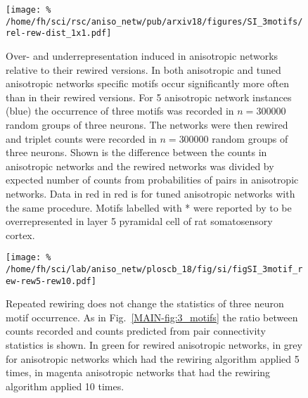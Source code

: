 
\addtocounter{subsection}{1}
\begin{figure}[h!]
  \texttt{[image: \%
    /home/fh/sci/rsc/aniso\_netw/pub/arxiv18/figures/SI\_3motifs/rel-rew-dist\_1x1.pdf]}
  \caption{Over- and underrepresentation induced in anisotropic
    networks relative to their rewired versions. In both anisotropic
    and tuned anisotropic networks specific motifs occur significantly
    more often than in their rewired versions. For 5 anisotropic
    network instances (blue) the occurrence of three motifs was
    recorded in $n=300000$ random groups of three neurons. The
    networks were then rewired and triplet counts were recorded in
    $n=300000$ random groups of three neurons. Shown is the difference
    between the counts in anisotropic networks and the rewired
    networks was divided by expected number of counts from
    probabilities of pairs in anisotropic networks. Data in red in red
    is for tuned anisotropic networks with the same procedure. Motifs
    labelled with * were reported by \textcite{Perin2011} to be
    overrepresented in layer 5 pyramidal cell of rat somatosensory
    cortex.}
  \label{fig:3motif_rel} 
\end{figure}


\addtocounter{subsection}{1}
\begin{figure}[h!]
  \texttt{[image: \%
   /home/fh/sci/lab/aniso\_netw/ploscb\_18/fig/si/figSI\_3motif\_rew-rew5-rew10.pdf]}
 \caption{Repeated rewiring does not change the statistics of three
   neuron motif occurrence. As in Fig.~\ref{MAIN-fig:3_motifs} the
   ratio between counts recorded and counts predicted from pair
   connectivity statistics is shown. In green for rewired anisotropic
   networks, in grey for anisotropic networks which had the rewiring
   algorithm applied 5 times, in magenta anisotropic networks that had
   the rewiring algorithm applied 10 times.}
  \label{fig:3motif_rr5r10} 
\end{figure}

